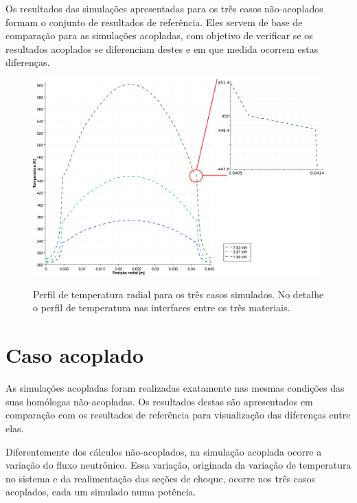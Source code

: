 Os resultados das simulações apresentadas para os três casos não-acoplados formam o conjunto de resultados
de referência. Eles servem de base de comparação para as simulações acopladas, com objetivo de verificar
se os resultados acoplados se diferenciam destes e em que medida ocorrem estas diferenças.

\begin{figure}[htb]
  \caption[Perfil de temperatura radial para os três casos simulados.]
          {Perfil de temperatura radial para os três casos simulados. No detalhe o perfil de temperatura nas interfaces entre os três materiais.}
  \centering\includegraphics[scale=0.5]{figuras/T_x_NC_square_port_detalhado.png}
  \label{fig:perf-t-nac-radial}
\end{figure}


\section{Caso acoplado}
\label{sec:cp}

As simulações acopladas foram realizadas exatamente nas mesmas condições das suas homólogas não-acopladas.
Os resultados destas são apresentados em comparação com os resultados de referência para visualização
das diferenças entre elas.

Diferentemente dos cálculos não-acoplados, na simulação acoplada ocorre a variação do fluxo neutrônico.
Essa variação, originada da variação de temperatura no sistema e da realimentação das seções de choque, ocorre nos três casos acoplados, cada
um simulado numa potência.

